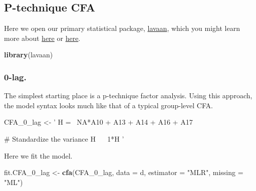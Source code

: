 \documentclass[]{article}
\newenvironment{Shaded}{\begin{snugshade}}{\end{snugshade}}
\newcommand{\KeywordTok}[1]{\textcolor[rgb]{0.13,0.29,0.53}{\textbf{#1}}}
\newcommand{\DataTypeTok}[1]{\textcolor[rgb]{0.13,0.29,0.53}{#1}}
\newcommand{\StringTok}[1]{\textcolor[rgb]{0.31,0.60,0.02}{#1}}
\newcommand{\OperatorTok}[1]{\textcolor[rgb]{0.81,0.36,0.00}{\textbf{#1}}}
\newcommand{\NormalTok}[1]{#1}
\begin{document}
\begin{Shaded}
\end{Shaded}

\subsection{P-technique CFA}\label{p-technique-cfa}

Here we open our primary statistical package,
\href{https://cran.r-project.org/web/packages/lavaan/index.html}{lavaan},
which you might learn more about
\href{https://dornsife.usc.edu/assets/sites/210/docs/GC3/lavaan_tutorial.pdf}{here}
or \href{http://lavaan.ugent.be/tutorial/index.html}{here}.

\begin{Shaded}
\begin{Highlighting}[]
\KeywordTok{library}\NormalTok{(lavaan)}
\end{Highlighting}
\end{Shaded}

\subsubsection{0-lag.}\label{lag.}

The simplest starting place is a p-technique factor analysis. Using this
approach, the model syntax looks much like that of a typical group-level
CFA.

\begin{Shaded}
\begin{Highlighting}[]
\NormalTok{CFA_0_lag <-}\StringTok{ '}
\StringTok{H =~ NA*A10 + A13 + A14 + A16 + A17}

\StringTok{# Standardize the variance}
\StringTok{H ~~ 1*H}
\StringTok{'}
\end{Highlighting}
\end{Shaded}

Here we fit the model.

\begin{Shaded}
\begin{Highlighting}[]
\NormalTok{fit.CFA_0_lag <-}\StringTok{ }
\StringTok{  }\KeywordTok{cfa}\NormalTok{(CFA_0_lag, }
      \DataTypeTok{data =}\NormalTok{ d,}
      \DataTypeTok{estimator =} \StringTok{"MLR"}\NormalTok{,}
      \DataTypeTok{missing =} \StringTok{"ML"}\NormalTok{)}
\end{Highlighting}
\end{Shaded}
\end{document}
